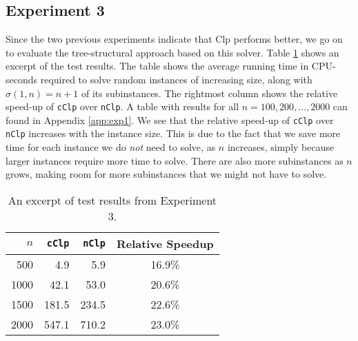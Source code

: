 \subsection*{Experiment 3}
Since the two previous experiments indicate that Clp performs better, we
go on to evaluate the tree-structural approach based on this solver.
Table \ref{table:expfour} shows an excerpt of the test results. The table
shows the average running time in CPU-seconds required to solve random instances
of increasing size, along with $\sigma(1, n) = n + 1$ of its subinstances. The rightmost
column shows the relative speed-up of \texttt{cClp} over \texttt{nClp}.
A table with results for all $n=100,200,\ldots,2000$ can found in Appendix
\ref{app:exp1}.
We see that the relative speed-up of \texttt{cClp} over \texttt{nClp}
increases with the instance size.
This is due to the fact that we save more time for each instance we do
\emph{not} need to solve, as $n$ increases, simply because larger instances
require more time to solve.
There are also more subinstances as $n$ grows, making room for more subinstances
that we might not have to solve.

\begin{table}[ht!]
    \centering
    \caption{An excerpt of test results from Experiment 3.}
    \label{table:expfour}
\begin{tabular}{rrrc}
    $n$ & \texttt{cClp}  & \texttt{nClp}  & Relative Speedup \\ \hline
    500 & 4.9   & 5.9   & 16.9\% \\
   1000 & 42.1  & 53.0  & 20.6\% \\
   1500 & 181.5 & 234.5 & 22.6\% \\
   2000 & 547.1 & 710.2 & 23.0\%
\end{tabular}
\end{table}

